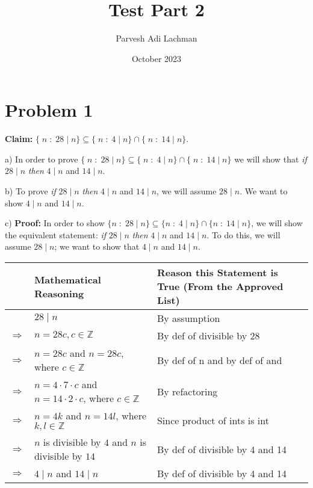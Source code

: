 \documentclass{article}
\title{Test Part 2}
\author{Parvesh Adi Lachman}
\date{October 2023}
\begin{document}
\maketitle

\section{Problem 1}
\textbf{Claim:} $\{\;n\;\colon\;28\mid n\}\subseteq\{\;n\;\colon\;4\mid n\}\cap\{\;n\;\colon\;14\mid n\}$.\vspace{10pt}

a) In order to prove $\{\;n\;\colon\;28\mid n\}\subseteq\{\;n\;\colon\;4\mid n\}\cap\{\;n\;\colon\;14\mid n\}$ we will show that \textit{if} $28\mid n$ \textit{then} $4\mid n$ and $14\mid n$.\vspace{10pt}

b) To prove \textit{if} $28\mid n$ \textit{then} $4\mid n$ and $14\mid n$, we will assume $28\mid n$.  We want to show $4\mid n$ and $14\mid n$.\vspace{10pt}

c) \textbf{Proof:} In order to show $\{n\;\colon\;28\mid n\}\subseteq\{n\;\colon\;4\mid n\}\cap\{n\;\colon\;14\mid n\}$, we will show the equivalent statement: \textit{if} $28\mid n$ \textit{then} $4\mid n$ and $14\mid n$. To do this, we will assume $28\mid n$; we want to show that $4\mid n$ and $14\mid n$.\vspace{5pt}
\begin{flushleft}
    \begin{tabular}{|p{1.3cm}|p{5.4cm}|p{5.8cm}|}
    \hline
     & \textbf{Mathematical Reasoning} & \textbf{Reason this Statement is True (From the Approved List)} \\
    \hline
     & $28\mid n$ & By assumption \\
     \hline
    $\Rightarrow$ & $n=28c,c\in\mathbb{Z}$ & By def of divisible by 28 \\
    \hline
    $\Rightarrow$ & $n=28c$ and $n=28c$, where $c\in\mathbb{Z}$ & By def of n and by def of and \\
    \hline
    $\Rightarrow$ & $n=4\cdot 7\cdot c$ and $n=14\cdot 2\cdot c$, where $c\in\mathbb{Z}$ & By refactoring \\
    \hline
    $\Rightarrow$ & $n=4k$ and $n=14l$, where $k,l\in\mathbb{Z}$ & Since product of ints is int \\
    \hline
    $\Rightarrow$ & $n$ is divisible by $4$ and $n$ is divisible by $14$ & By def of divisible by 4 and 14\\
    \hline
    $\Rightarrow$ & $4\mid n$ and $14\mid n$ & By def of divisible by 4 and 14 \\
    \hline
    \end{tabular}
\end{flushleft}\vspace{10pt}
\end{document}
